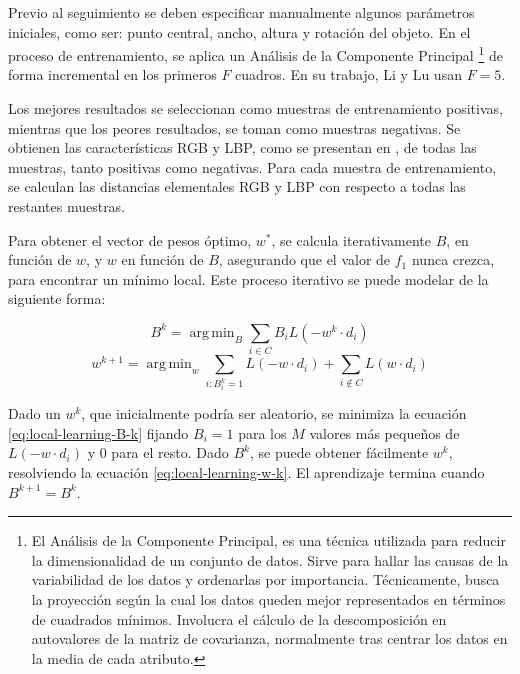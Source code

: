 \documentclass[a4paper,10pt]{article}
\DeclareMathOperator*{\argmin}{arg\,min}
\begin{document}
Previo al seguimiento se deben especificar manualmente algunos parámetros iniciales,
como ser: punto central, ancho, altura y rotación del objeto. En el proceso de
entrenamiento, se aplica un Análisis de la Componente Principal
\footnote{El Análisis de la Componente Principal, es una técnica utilizada para reducir la dimensionalidad de un conjunto de datos.
Sirve para hallar las causas de la variabilidad de los datos y ordenarlas por importancia.
Técnicamente, busca la proyección según la cual los datos queden mejor representados en términos de cuadrados mínimos. Involucra el cálculo de la descomposición en
autovalores de la matriz de covarianza, normalmente tras centrar los datos en la media de cada atributo.}
de forma incremental en los primeros $F$ cuadros. En su trabajo, Li y Lu usan
$F = 5$.\cite{local-learning}

Los mejores resultados se seleccionan como muestras de entrenamiento positivas, mientras que
los peores resultados, se toman como muestras negativas. Se obtienen las características
RGB y LBP, como se presentan en \cite{tracking-bag-of-features}, de todas las muestras,
tanto positivas como negativas. Para cada muestra de entrenamiento, se calculan las
distancias elementales RGB y LBP con respecto a todas las restantes muestras.

Para obtener el vector de pesos óptimo, $w^{*}$, se calcula iterativamente $B$,
en función de $w$, y $w$ en función de $B$, asegurando que el valor de $f_{1}$ nunca
crezca, para encontrar un mínimo local. Este proceso iterativo se puede modelar de la
siguiente forma:

\begin{equation}
   \label{eq:local-learning-B-k}
   B^{k} = \argmin_{B} \sum_{i \in C} B_{i}L(-w^{k} \cdot d_{i})
\end{equation}
\begin{equation}
    \label{eq:local-learning-w-k}
    w^{k+1} = \argmin_{w} \sum_{i:B_{i}^{k}=1} L(-w \cdot d_{i}) + \sum_{i\notin C}L(w \cdot d_{i})
\end{equation}

Dado un $w^{k}$, que inicialmente podría ser aleatorio, se minimiza la ecuación
\ref{eq:local-learning-B-k} fijando $B_{i} = 1$ para los $M$ valores más
pequeños de $L(-w \cdot d_{i})$ y $0$ para el resto. Dado $B^{k}$, se puede
obtener fácilmente $w^{k}$, resolviendo la ecuación \ref{eq:local-learning-w-k}.
El aprendizaje termina cuando $B^{k+1}=B^{k}$.\\
\end{document}

